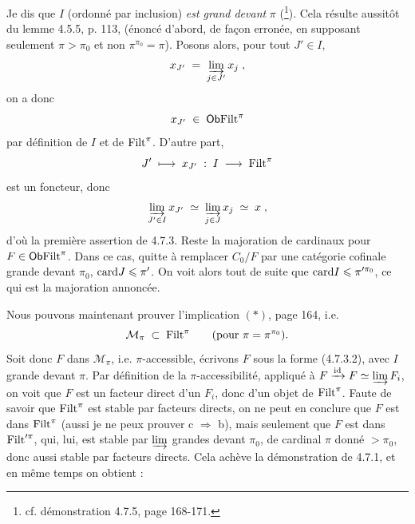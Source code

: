 
Je dis que $I$ (ordonné par inclusion) \textit{est grand devant} $\pi$ (\footnote[69]{cf. démonstration 4.7.5, page 168-171.}). Cela résulte aussitôt du lemme 4.5.5, p. 113, (énoncé d’abord, de façon erronée, en supposant seulement $\pi > \pi_0$ et non $\pi^{\pi_0} = \pi$). Posons alors, pour tout $J' \in I$,
\[
x_{J'} \;=\; \varinjlim_{j \in J'} x_j \;,
\]
on a donc
\[
x_{J'} \;\in\; \mathsf{Ob} \mathrm{Filt}^{\pi}
\]
par définition de $I$ et de $\mathrm{Filt}^{\pi}$. D’autre part,
\[
J' \;\longmapsto\; x_{J'} \;:\; I \;\longrightarrow\; \mathrm{Filt}^{\pi}
\]
est un foncteur, donc
\[
\varinjlim_{J' \in I} x_{J'} \;\simeq\; \varinjlim_{j \in J} x_j \;\simeq\; x \;, %
\]
d’où la première assertion de 4.7.3. Reste la majoration de cardinaux pour $F \in \mathsf{Ob} \mathrm{Filt}^{\pi}$. Dans ce cas, quitte à remplacer $C_0/F$ par une catégorie cofinale grande devant $\pi_0$, $\mathrm{card} J \leqslant \pi'$. On voit alors tout de suite que $\mathrm{card} I \leqslant \pi'^{\pi_0}$, ce qui est la majoration annoncée.

Nous pouvons maintenant prouver l’implication $(*)$, page 164, i.e.
\[
\mathcal{M}_{\pi} \;\subset\; \mathrm{Filt}^{\pi} \qquad (\text{pour } \pi = \pi^{\pi_0}).
\]
Soit donc $F$ dans $\mathcal{M}_{\pi}$, i.e. $\pi$-accessible, écrivons $F$ sous la forme (4.7.3.2), avec $I$ grande devant $\pi$. Par définition de la $\pi$-accessibilité, appliqué à $F \xrightarrow{\mathrm{id}} F \simeq \varinjlim F_i$, on voit que $F$ est un facteur direct d’un $F_i$, donc d’un objet de $\mathrm{Filt}^{\pi}$. Faute de savoir que $\mathrm{Filt}^{\pi}$ est stable par facteurs directs, on ne peut en conclure que $F$ est dans $\mathrm{Filt}^{\pi}$ (aussi je ne peux prouver c $\Longrightarrow$ b), mais seulement que $F$ est dans $\mathrm{Filt}'^{\pi}$, qui, lui, est stable par $\varinjlim$ grandes devant $\pi_0$, de cardinal $\pi$ donné $> \pi_0$, donc aussi  stable par facteurs directs. Cela achève la démonstration de 4.7.1, et en même temps on obtient :

